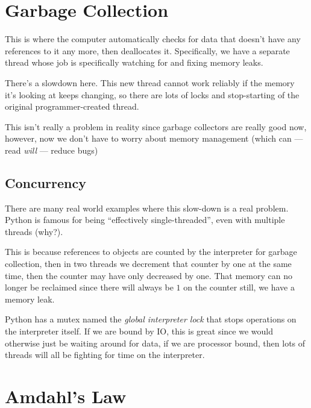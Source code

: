 \section{Garbage Collection}\label{sec:garbage_collection}

This is where the computer automatically checks for data that doesn't have any references to it any more, then deallocates it.
Specifically, we have a separate thread whose job is specifically watching for and fixing memory leaks.

There's a slowdown here.
This new thread cannot work reliably if the memory it's looking at keeps changing, so there are lots of locks and stop-starting of the original programmer-created thread.

This isn't really a problem in reality since garbage collectors are really good now, however, now we don't have to worry about memory management (which can --- read \emph{will} --- reduce bugs)

\subsection{Concurrency}\label{sub:concurrency}

There are many real world examples where this slow-down is a real problem.
Python is famous for being ``effectively single-threaded'', even with multiple threads (why?).

This is because references to objects are counted by the interpreter for garbage collection, then in two threads we decrement that counter by one at the same time, then the counter may have only decreased by one.
That memory can no longer be reclaimed since there will always be \(1\) on the counter still, we have a memory leak.

Python has a mutex named the \emph{global interpreter lock} that stops operations on the interpreter itself.
If we are bound by IO, this is great since we would otherwise just be waiting around for data, if we are processor bound, then lots of threads will all be fighting for time on the interpreter.

\section{Amdahl's Law}\label{sec:amdahl_s_law}

